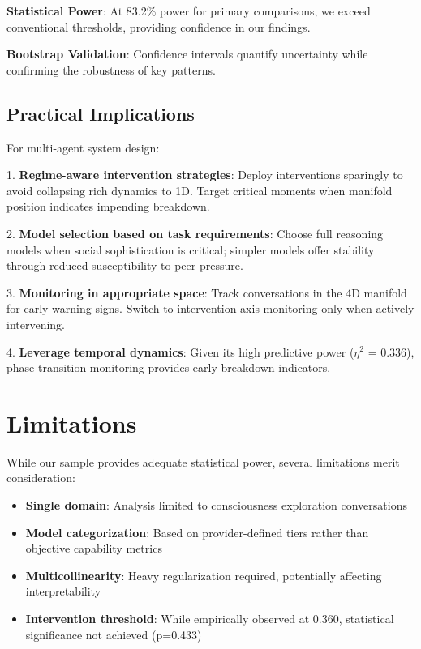 \documentclass[11pt,letterpaper]{article}
\newcommand{\powerOutcomeGroups}{83.2\%}
\newcommand{\interventionThreshold}{0.360}
\newcommand{\interventionThresholdPValue}{0.433}
\newcommand{\temporalDynamicsEtaSquared}{0.336}
\begin{document}
\textbf{Statistical Power}: At \powerOutcomeGroups{} power for primary comparisons, we exceed conventional thresholds, providing confidence in our findings.

\textbf{Bootstrap Validation}: Confidence intervals quantify uncertainty while confirming the robustness of key patterns.

\subsection{Practical Implications}

For multi-agent system design:

1. \textbf{Regime-aware intervention strategies}: Deploy interventions sparingly to avoid collapsing rich dynamics to 1D. Target critical moments when manifold position indicates impending breakdown.

2. \textbf{Model selection based on task requirements}: Choose full reasoning models when social sophistication is critical; simpler models offer stability through reduced susceptibility to peer pressure.

3. \textbf{Monitoring in appropriate space}: Track conversations in the 4D manifold for early warning signs. Switch to intervention axis monitoring only when actively intervening.

4. \textbf{Leverage temporal dynamics}: Given its high predictive power ($\eta^2$ = \temporalDynamicsEtaSquared{}), phase transition monitoring provides early breakdown indicators.

\section{Limitations}

While our sample provides adequate statistical power, several limitations merit consideration:

\begin{itemize}
    \item \textbf{Single domain}: Analysis limited to consciousness exploration conversations
    \item \textbf{Model categorization}: Based on provider-defined tiers rather than objective capability metrics
    \item \textbf{Multicollinearity}: Heavy regularization required, potentially affecting interpretability
    \item \textbf{Intervention threshold}: While empirically observed at \interventionThreshold{}, statistical significance not achieved (p=\interventionThresholdPValue{})
\end{itemize}
\end{document}
